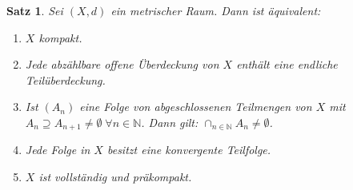 \documentclass[ngerman]{report}
\theoremstyle{plain}%
\newtheorem{thm}{Satz}[chapter]
\theoremstyle{definition}%
\theoremstyle{myStyle}
\newcommand{\N}{\mathbb{N}}
\begin{document}
\begin{thm}
	Sei $(X,d)$ ein metrischer Raum. Dann ist äquivalent:
	\begin{enumerate}[(1)]
	\item $X$ kompakt.
	
	\item Jede abzählbare offene Überdeckung von $X$ enthält eine endliche Teilüberdeckung.
	
	\item Ist $(A_n)$ eine Folge von abgeschlossenen Teilmengen von $X$ mit $A_n \supseteq A_{n+1} \not = \emptyset\; \forall n\in\N$. Dann gilt: $\cap_{n\in\N}A_n \not = \emptyset$.
	
	\item Jede Folge in $X$ besitzt eine konvergente Teilfolge.
	
	\item $X$ ist vollständig und präkompakt.
	\end{enumerate}
\end{thm}
\end{document}
